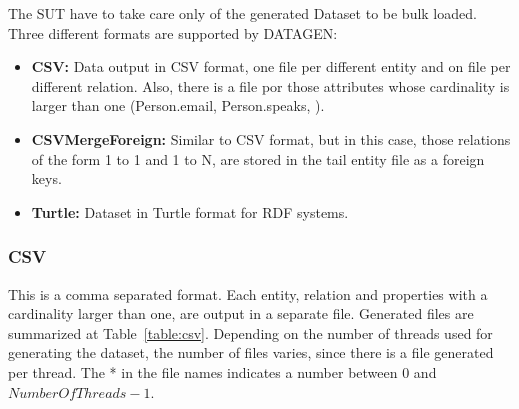 The SUT have to take care only of the generated Dataset to be bulk loaded.
Three different formats are supported by DATAGEN:

\begin{itemize}
  \item \textbf{CSV:} Data output in CSV format, one file per different entity and on file
    per different relation. Also, there is a file por those attributes whose
    cardinality is larger than one (\ie Person.email, Person.speaks, \etc).
  \item \textbf{CSVMergeForeign:} Similar to CSV format, but in this case, those
    relations of the form 1 to 1 and 1 to N, are stored in the tail entity file as
    a foreign keys.
  \item \textbf{Turtle:} Dataset in Turtle format for RDF systems.
\end{itemize}



\subsubsection{CSV}

This is a comma separated format. Each entity, relation and properties with a
cardinality larger than one, are output in a separate file. Generated files are
summarized at Table~\ref{table:csv}.  Depending on the number of threads used
for generating the dataset, the number of files varies, since there is a file
generated per thread. The * in the file names indicates a number between 0 and
$\mathit{NumberOfThreads}-1$.

